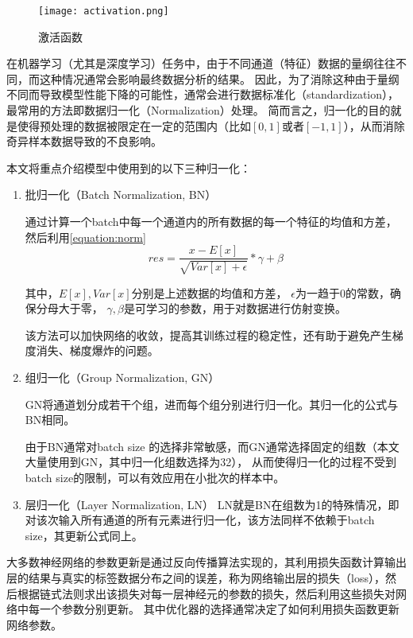 \begin{figure}[h]
  \centering
\texttt{[image: activation.png]}
\caption{激活函数}
\label{figure:activation}
  
\end{figure}

在机器学习（尤其是深度学习）任务中，由于不同通道（特征）数据的量纲往往不同，而这种情况通常会影响最终数据分析的结果。
因此，为了消除这种由于量纲不同而导致模型性能下降的可能性，通常会进行数据标准化（standardization），最常用的方法即数据归一化（Normalization）处理。
简而言之，归一化的目的就是使得预处理的数据被限定在一定的范围内（比如$[0,1]$或者$[-1,1]$），从而消除奇异样本数据导致的不良影响。

本文将重点介绍模型中使用到的以下三种归一化：
\begin{enumerate}
  \item 批归一化（Batch Normalization, BN）

  
  通过计算一个batch中每一个通道内的所有数据的每一个特征的均值和方差，然后利用\cref{equation:norm}
\begin{equation}
  \label{equation:norm}
  res = \frac{x - E\left[ x\right]}{\sqrt{Var\left[ x\right] + \epsilon}} * \gamma + \beta
\end{equation}

其中，$E\left[ x\right], Var\left[ x\right]$分别是上述数据的均值和方差， $\epsilon$为一趋于0的常数，确保分母大于零，
$\gamma, \beta$是可学习的参数，用于对数据进行仿射变换。

该方法可以加快网络的收敛，提高其训练过程的稳定性，还有助于避免产生梯度消失、梯度爆炸的问题。

  \item 组归一化（Group Normalization, GN）
  
  GN将通道划分成若干个组，进而每个组分别进行归一化。其归一化的公式与BN相同。
  
  由于BN通常对batch size 的选择非常敏感，而GN通常选择固定的组数（本文大量使用到GN，其中归一化组数选择为32），
  从而使得归一化的过程不受到batch size的限制，可以有效应用在小批次的样本中。

  \item 层归一化（Layer Normalization, LN）
  LN就是BN在组数为1的特殊情况，即对该次输入所有通道的所有元素进行归一化，该方法同样不依赖于batch size，其更新公式同上。
\end{enumerate}


大多数神经网络的参数更新是通过反向传播算法实现的，其利用损失函数计算输出层的结果与真实的标签数据分布之间的误差，称为网络输出层的损失（loss），然后根据链式法则求出该损失对每一层神经元的参数的损失，然后利用这些损失对网络中每一个参数分别更新。
其中优化器的选择通常决定了如何利用损失函数更新网络参数。

